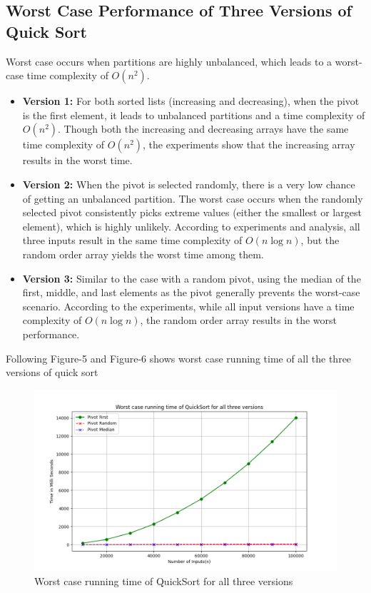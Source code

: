 \documentclass[a4paper,12pt]{report}
\begin{document}
\subsection{Worst Case Performance of Three Versions of Quick Sort}
Worst case occurs when partitions are highly unbalanced, which leads to a worst-case time complexity of \(O(n^2)\).
\begin{itemize}
    \item \textbf{Version 1:} For both sorted lists (increasing and decreasing), when the pivot is the first element, it leads to unbalanced partitions and a time complexity of \(O(n^2)\). Though both the increasing and decreasing arrays have the same time complexity of \(O(n^2)\), the experiments show that the increasing array results in the worst time.

    \item \textbf{Version 2:} When the pivot is selected randomly, there is a very low chance of getting an unbalanced partition. The worst case occurs when the randomly selected pivot consistently picks extreme values (either the smallest or largest element), which is highly unlikely. According to experiments and analysis, all three inputs result in the same time complexity of \(O(n \log n)\), but the random order array yields the worst time among them.

    \item \textbf{Version 3:} Similar to the case with a random pivot, using the median of the first, middle, and last elements as the pivot generally prevents the worst-case scenario. According to the experiments, while all input versions have a time complexity of \(O(n \log n)\), the random order array results in the worst performance.

\end{itemize}
Following Figure-5 and Figure-6 shows worst case running time of all the three versions of quick sort
\begin{figure}[H]
    \centering
    \includegraphics[width=1.1\textwidth]{./Worst_case_QuickSort.png}
    \caption{Worst case running time of QuickSort for all three versions}
    \label{fig:Worst case quicksort}
\end{figure}
\end{document}
